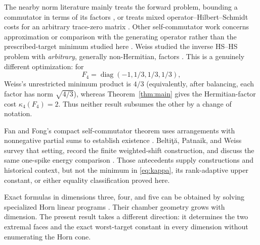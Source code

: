 \documentclass[11pt]{article}
\theoremstyle{definition}
\theoremstyle{remark}
\newcommand{\diag}{\operatorname{diag}}
\newcommand{\1}{\mathbf 1}
\begin{document}
The nearby norm literature mainly treats the forward problem, bounding a commutator in terms of its factors \cite{fong1986,bottcher2005,bottcher2008,cheng2010,gil2017}, or treats mixed operator--Hilbert--Schmidt costs for an arbitrary trace-zero matrix \cite{johnson2013,angel2015}.  Other self-commutator work concerns approximation or comparison with the generating operator rather than the prescribed-target minimum studied here \cite{maher2006,filonov2011,zhang2026}.  Weiss studied the inverse HS--HS problem with \emph{arbitrary}, generally non-Hermitian, factors \cite{weiss1980}.  This is a genuinely different optimization: for
\[
 F_4=\diag(-1,1/3,1/3,1/3),
\]
Weiss's unrestricted minimum product is $4/3$ (equivalently, after balancing, each factor has norm $\sqrt{4/3}$), whereas Theorem~\ref{thm:main} gives the Hermitian-factor cost $\kappa_4(F_4)=2$.  Thus neither result subsumes the other by a change of notation.

Fan and Fong's compact self-commutator theorem uses arrangements with nonnegative partial sums to establish existence \cite{fan1980}.  Belti\c{t}\u{a}, Patnaik, and Weiss survey that setting, record the finite weighted-shift construction, and discuss the same one-spike energy comparison \cite{beltita2014}.  Those antecedents supply constructions and historical context, but not the minimum in \eqref{eq:kappa}, its rank-adaptive upper constant, or either equality classification proved here.

Exact formulas in dimensions three, four, and five can be obtained by solving specialized Horn linear programs \cite{eriksson2026qutrit,eriksson2026four,eriksson2026five}.  Their chamber geometry grows with dimension.  The present result takes a different direction: it determines the two extremal faces and the exact worst-target constant in every dimension without enumerating the Horn cone.
\end{document}
